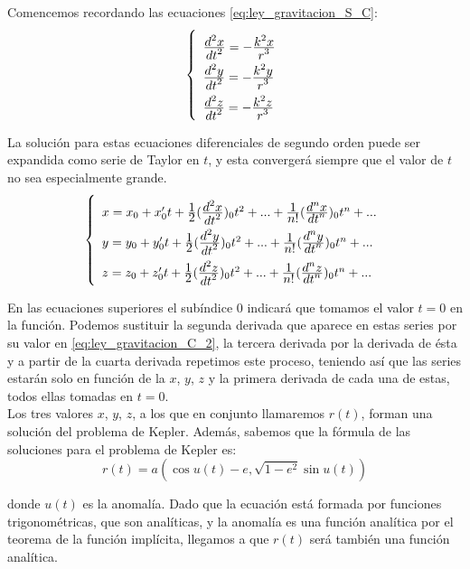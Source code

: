 Comencemos recordando las ecuaciones \eqref{eq:ley_gravitacion_S_C}:
\begin{align}
\left\{
\def\arraystretch{2}
\begin{array}{l}
	\ddfrac{d^2x}{dt^2}=-\ddfrac{k^2x}{r^3}\\
	\ddfrac{d^2y}{dt^2}=-\ddfrac{k^2y}{r^3}\\
	\ddfrac{d^2z}{dt^2}=-\ddfrac{k^2z}{r^3}
\end{array}
\right.
\label{eq:ley_gravitacion_C_2}
\end{align}

La solución para estas ecuaciones diferenciales de segundo orden puede ser expandida como serie de Taylor en $t$, y esta convergerá siempre que el valor de $t$ no sea especialmente grande.
\begin{align}
\left\{
\def\arraystretch{2}
\begin{array}{l}
	x=x_0+x_0't+\ddfrac{1}{2}(\ddfrac{d^2x}{dt^2})_0t^2+...+\ddfrac{1}{n!}(\ddfrac{d^nx}{dt^n})_0t^n+...\\
	y=y_0+y_0't+\ddfrac{1}{2}(\ddfrac{d^2y}{dt^2})_0t^2+...+\ddfrac{1}{n!}(\ddfrac{d^ny}{dt^n})_0t^n+...\\
	z=z_0+z_0't+\ddfrac{1}{2}(\ddfrac{d^2z}{dt^2})_0t^2+...+\ddfrac{1}{n!}(\ddfrac{d^nz}{dt^n})_0t^n+...\\	
\end{array}
\right.
\label{eq:series_taylor}
\end{align}

En las ecuaciones superiores el subíndice 0 indicará que tomamos el valor $t=0$ en la función. Podemos sustituir la segunda derivada que aparece en estas series por su valor en \eqref{eq:ley_gravitacion_C_2}, la tercera derivada por la derivada de ésta y a partir de la cuarta derivada repetimos este proceso, teniendo así que las series estarán solo en función de la $x$, $y$, $z$ y la primera derivada de cada una de estas, todos ellas tomadas en $t=0$. \cite{moulton}\\

Los tres valores $x$, $y$, $z$, a los que en conjunto llamaremos $r(t)$, forman una solución del problema de Kepler. Además, sabemos que la fórmula de las soluciones para el problema de Kepler es:
\[
r(t)=a(\cos{u(t)}-e,\sqrt{1-e^2}\sin{u(t)})
\]

\noindent donde $u(t)$ es la anomalía. Dado que la ecuación está formada por funciones trigonométricas, que son analíticas, y la anomalía es una función analítica por el teorema de la función implícita, llegamos a que $r(t)$ será también una función analítica. \cite{mecanica_celeste}\\

